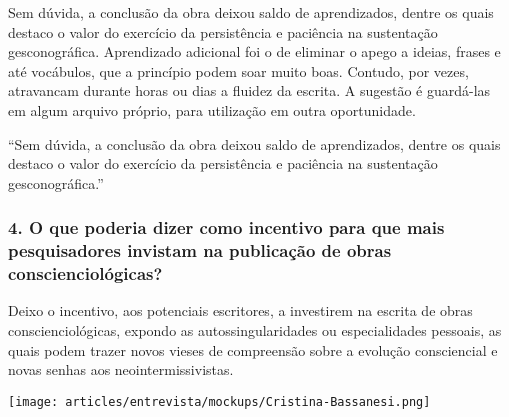 \documentclass{gescons}
\begin{document}
\begin{multicols}{2}
Sem dúvida, a conclusão da obra deixou saldo de aprendizados, dentre os quais destaco o valor do exercício da persistência e paciência na sustentação gesconográfica. Aprendizado adicional foi o de eliminar o apego a ideias, frases e até vocábulos, que a princípio podem soar muito boas. Contudo, por vezes, atravancam durante horas ou dias a fluidez da escrita. A sugestão é guardá-las em algum arquivo próprio, para utilização em outra oportunidade. 

\begin{pullquote}
``Sem dúvida, a conclusão da obra deixou saldo de aprendizados, dentre os quais destaco o valor do exercício da persistência e paciência na sustentação gesconográfica.''
\end{pullquote}

\subsubsection{4. O que poderia dizer como incentivo para que mais pesquisadores invistam na publicação de obras conscienciológicas?}

Deixo o incentivo, aos potenciais escritores, a investirem na escrita de obras conscienciológicas, expondo as autossingularidades ou especialidades pessoais, as quais podem trazer novos vieses de compreensão sobre a evolução consciencial e novas senhas aos neointermissivistas. 


\begin{center}
    \texttt{[image: articles/entrevista/mockups/Cristina-Bassanesi.png]}
\end{center}
    
    \end{multicols}
\end{document}
